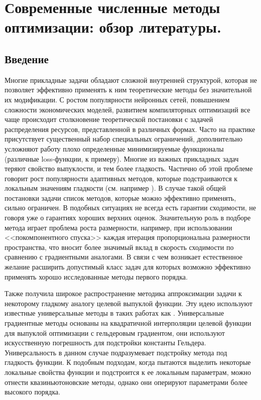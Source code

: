 \chapter{Современные численные методы оптимизации: обзор литератyры.}\label{ch:ch1}

\section{Введение}\label{sec:ch1/sec1}

  Многие прикладные задачи обладают сложной внутренней структурой, которая не позволяет эффективно применять к ним теоретические методы без значительной их модификации. С ростом популярности нейронных сетей, повышением сложности экономических моделей, развитием компиляторных оптимизаций все чаще происходит столкновение теоретической постановки с задачей распределения ресурсов, представленной в различных формах. Часто на практике присутствует существенный набор специальных ограничений, дополнительно усложняют работу плохо определенные минимизируемые функционалы (различные loss-функции, к примеру). Многие из важных прикладных задач теряют свойство выпуклости, и тем более гладкость. Частично об этой проблеме говорит рост популярности адаптивных методов, которые подстраиваются к локальным значениям гладкости (см. например \cite{o2015adaptive, AdaMirr_2021, UMP}). В случае такой общей постановки задачи список методов, которые можно эффективно применять, сильно ограничен. В подобных ситуациях не всегда есть гарантии сходимости, не говоря уже о гарантиях хороших верхних оценок. Значительную роль в подборе метода играет проблема роста размерности, например, при использовании <<покомпонентного спуска>> каждая итерация пропорциональна размерности пространства, что вносит более значимый вклад в скорость сходимости по сравнению с градиентными аналогами. В связи с чем возникает естественное желание расширить допустимый класс задач для которых возможно эффективно применять хорошо исследованные методы первого порядка. 

  Также получила широкое распространение методика аппроксимации задачи к некоторому гладкому аналогу целевой выпуклой функции. Эту идею используют известные универсальные методы в таких работах как \cite{gasnikov2017universal, guminov2019universal}. Универсальные градиентные методы основаны на квадратичной интерполяции целевой функции для выпуклой оптимизации с гельдеровым градиентом, они используют искусственную погрешность для подстройки константы Гельдера. Универсальность в данном случае подразумевает подстройку метода под гладкость функции. К подобным подходам, когда пытаются выделить некоторые локальные свойства функции и подстроится к ее локальным параметрам, можно отнести квазиньютоновские методы, однако они оперируют параметрами более высокого порядка. 


